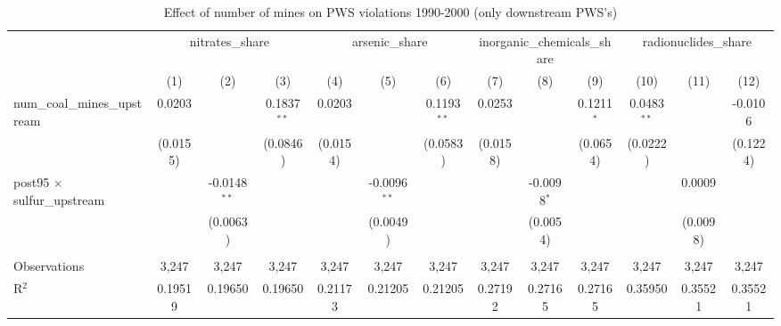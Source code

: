 
\begin{table}[htbp]
   \caption{\label{olsrf2sls_nummine_mine_vio_1990to2000dwnstrm} Effect of number of mines on PWS violations 1990-2000 (only downstream PWS's)}
   \bigskip
   \centering
   \begin{adjustbox}{width = \textwidth, center}
      \begin{tabular}{lcccccccccccc}
         \toprule
          & \multicolumn{3}{c}{nitrates\_share} & \multicolumn{3}{c}{arsenic\_share} & \multicolumn{3}{c}{inorganic\_chemicals\_share} & \multicolumn{3}{c}{radionuclides\_share}\\
                                                           & (1)           & (2)            & (3)           & (4)           & (5)            & (6)           & (7)           & (8)           & (9)           & (10)          & (11)                  & (12)\\  
         \midrule 
         num\_coal\_mines\_upstream                        & 0.0203        &                & 0.1837$^{**}$ & 0.0203        &                & 0.1193$^{**}$ & 0.0253        &               & 0.1211$^{*}$  & 0.0483$^{**}$ &                       & -0.0106\\   
                                                           & (0.0155)      &                & (0.0846)      & (0.0154)      &                & (0.0583)      & (0.0158)      &               & (0.0654)      & (0.0222)      &                       & (0.1224)\\   
         post95 $\times$ sulfur\_upstream                  &               & -0.0148$^{**}$ &               &               & -0.0096$^{**}$ &               &               & -0.0098$^{*}$ &               &               & 0.0009                &   \\   
                                                           &               & (0.0063)       &               &               & (0.0049)       &               &               & (0.0054)      &               &               & (0.0098)              &   \\   
          \\
         Observations                                      & 3,247         & 3,247          & 3,247         & 3,247         & 3,247          & 3,247         & 3,247         & 3,247         & 3,247         & 3,247         & 3,247                 & 3,247\\  
         R$^2$                                             & 0.19519       & 0.19650        & 0.19650       & 0.21173       & 0.21205        & 0.21205       & 0.27192       & 0.27165       & 0.27165       & 0.35950       & 0.35521               & 0.35521\\  

\end{tabular}
\end{adjustbox}
\end{table}
